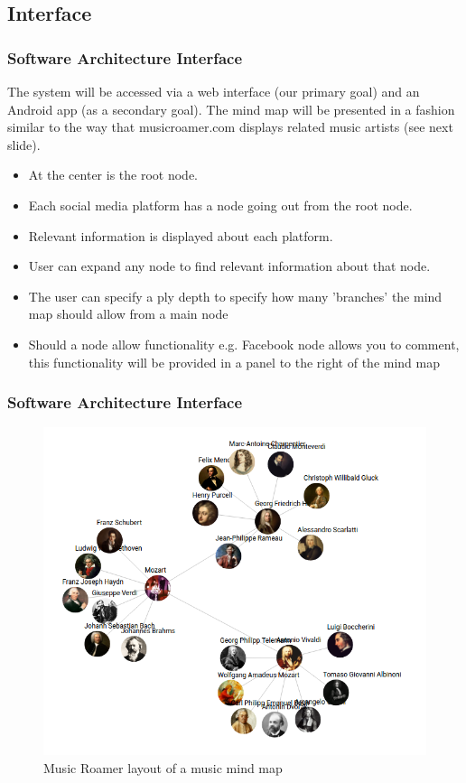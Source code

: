 \documentclass{beamer}
\begin{document}
	\subsection{Interface}
		\begin{frame}
		\frametitle{Software Architecture Interface}
			The system will be accessed via a web interface (our primary goal) and an Android app (as a secondary goal). The mind map will be presented in a fashion similar to the way that musicroamer.com displays related music artists (see next slide).
			
			\begin{itemize}
				\item At the center is the root node.
				\item Each social media platform has a node going out from the root node.
				\item Relevant information is displayed about each platform.
				\item User can expand any node to find relevant information about that node.
				\item The user can specify a ply depth to specify how many 'branches' the mind map should allow from a main node
				\item Should a node allow functionality e.g. Facebook node allows you to comment, this functionality will be provided in a panel to the right of the mind map
			\end{itemize}
		\end{frame}
		\begin{frame}
		\frametitle{Software Architecture Interface}
			\begin{figure}
				\includegraphics[scale=0.3]{musicroamer.png}
				\caption{Music Roamer layout of a music mind map}
			\end{figure}
		\end{frame}
		
\end{document}
